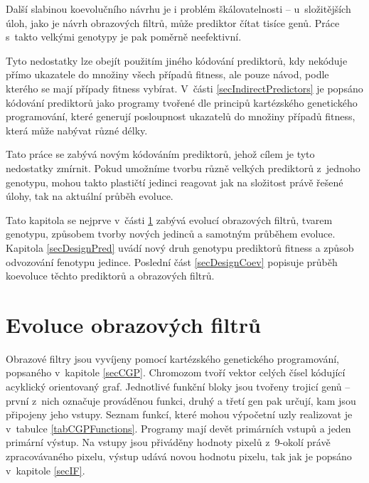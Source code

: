 Další slabinou koevolučního návrhu je i problém škálovatelnosti -- u~složitějších úloh, jako je návrh obrazových filtrů, může prediktor čítat tisíce genů. Práce s~takto velkými genotypy je pak poměrně neefektivní.

Tyto nedostatky lze obejít použitím jiného kódování prediktorů, kdy nekóduje přímo ukazatele do množiny všech případů fitness, ale pouze návod, podle kterého se mají případy fitness vybírat. V~části \ref{secIndirectPredictors} je popsáno kódování prediktorů jako programy tvořené dle principů kartézského genetického programování, které generují posloupnost ukazatelů do množiny případů fitness, která může nabývat různé délky.

Tato práce se zabývá novým kódováním prediktorů, jehož cílem je tyto nedostatky zmírnit. Pokud umožníme tvorbu různě velkých prediktorů z~jednoho genotypu, mohou takto plastičtí jedinci reagovat jak na složitost právě řešené úlohy, tak na aktuální průběh evoluce.

Tato kapitola se nejprve v~části \ref{secDesignIF} zabývá evolucí obrazových filtrů, tvarem genotypu, způsobem tvorby nových jedinců a samotným průběhem evoluce. Kapitola \ref{secDesignPred} uvádí nový druh genotypu prediktorů fitness a způsob odvozování fenotypu jedince. Poslední část \ref{secDesignCoev} popisuje průběh koevoluce těchto prediktorů a obrazových filtrů.

\section{Evoluce obrazových filtrů}
\label{secDesignIF}

Obrazové filtry jsou vyvíjeny pomocí kartézského genetického programování, popsaného v~kapitole \ref{secCGP}. Chromozom tvoří vektor celých čísel kódující acyklický orientovaný graf. Jednotlivé funkční bloky jsou tvořeny trojicí genů -- první z~nich označuje prováděnou funkci, druhý a třetí gen pak určují, kam jsou připojeny jeho vstupy. Seznam funkcí, které mohou výpočetní uzly realizovat je v~tabulce \ref{tabCGPFunctions}. Programy mají devět primárních vstupů a jeden primární výstup. Na vstupy jsou přiváděny hodnoty pixelů z~9-okolí právě zpracovávaného pixelu, výstup udává novou hodnotu pixelu, tak jak je popsáno v~kapitole \ref{secIF}.


